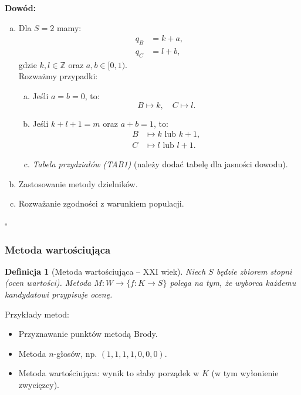 \documentclass[12pt,a4paper]{article}
\theoremstyle{break}
\newtheorem{definition}{Definicja}[section]
\begin{document}
	\noindent \textbf{Dowód:}
	\begin{enumerate}[a)]
		\item Dla $S = 2$ mamy:
		\begin{align*}
			q_B &= k + a, \\
			q_C &= l + b,
		\end{align*}
		gdzie $k, l \in \mathbb{Z}$ oraz $a, b \in [0, 1)$. \\
		Rozważmy przypadki:
		\begin{enumerate}[a)]
			\item Jeśli $a = b = 0$, to:
			\[
			B \mapsto k, \quad C \mapsto l.
			\]
			\item Jeśli $k + l + 1 = m$ oraz $a + b = 1$, to:
			\begin{align*}
				B &\mapsto k \text{ lub } k+1, \\
				C &\mapsto l \text{ lub } l+1.
			\end{align*}
			\item \textit{Tabela przydziałów (TAB1)} (należy dodać tabelę dla jasności dowodu).
		\end{enumerate}
		
		\item Zastosowanie metody dzielników.
		
		\item Rozważanie zgodności z warunkiem populacji.
	\end{enumerate}
	
	\begin{flushright}
		$\square$
	\end{flushright}
	
	\subsubsection{Metoda wartościująca}
	
	\begin{definition}[Metoda wartościująca -- XXI wiek]
		Niech $S$ będzie zbiorem stopni (ocen wartości). Metoda $M: W \to \{ f: K \to S \}$ polega na tym, że wyborca każdemu kandydatowi przypisuje ocenę.
	\end{definition}
	
	\noindent Przykłady metod:
	\begin{itemize}
		\item Przyznawanie punktów metodą Brody.
		\item Metoda $n$-głosów, np. $(1,1,1,1,0,0,0)$.
		\item Metoda wartościująca: wynik to słaby porządek w $K$ (w tym wyłonienie zwycięzcy).
	\end{itemize}
	
\end{document}
